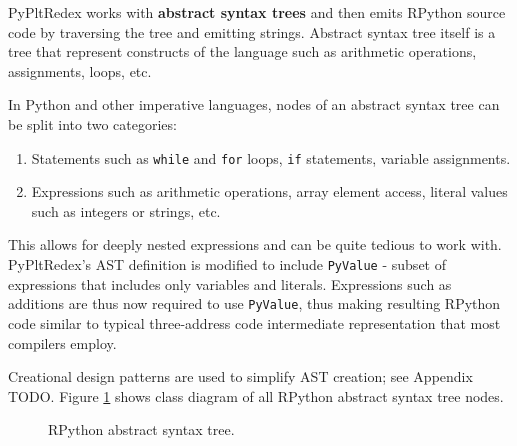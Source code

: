PyPltRedex works with \textbf{abstract syntax trees} and then emits RPython source code by traversing the tree and emitting strings. Abstract syntax tree itself is a tree that represent constructs of the language such as arithmetic operations, assignments, loops, etc.

In Python and other imperative languages, nodes of an abstract syntax tree can be split into two categories:

\begin{enumerate}
\item
Statements such as \texttt{while} and \texttt{for} loops, \texttt{if} statements, variable assignments.
\item
Expressions such as arithmetic operations, array element access, literal values such as integers or strings, etc.
\end{enumerate}

This allows for deeply nested expressions and can be quite tedious to work with. PyPltRedex's AST definition is modified to include \texttt{PyValue} - subset of expressions that includes only variables and literals. Expressions such as additions are thus now required to use \texttt{PyValue}, thus making resulting RPython code similar to typical three-address code intermediate representation that most compilers employ.

Creational design patterns are used to simplify AST creation; see Appendix TODO. Figure \ref{class-diagram-rpython} shows class diagram of all RPython abstract syntax tree nodes.

\begin{figure}[ht]
	\centering
	\caption{RPython abstract syntax tree.}
\label{class-diagram-rpython}
\end{figure}

